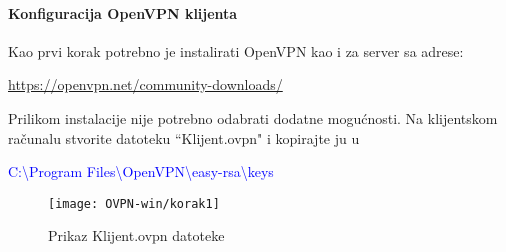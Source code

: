 \paragraph*{Konfiguracija OpenVPN klijenta}
\hfill \bigbreak

Kao prvi korak potrebno je instalirati OpenVPN kao i za server sa adrese:\smallbreak

\url{https://openvpn.net/community-downloads/}\smallbreak

Prilikom instalacije nije potrebno odabrati dodatne mogućnosti.\smallbreak
Na klijentskom računalu stvorite datoteku ``Klijent.ovpn" i kopirajte ju u 

\small\textcolor{blue}{C:\textbackslash Program Files\textbackslash OpenVPN\textbackslash easy-rsa\textbackslash keys}

\begin{figure}[h!]
	\centering
     \texttt{[image: OVPN-win/korak1]}
     \caption{Prikaz Klijent.ovpn datoteke}
\end{figure}
\FloatBarrier

